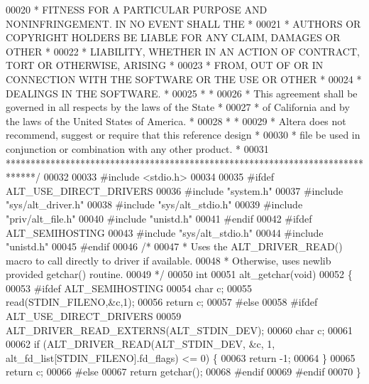 \begin{DoxyCode}
00020 \textcolor{comment}{* FITNESS FOR A PARTICULAR PURPOSE AND NONINFRINGEMENT. IN NO EVENT SHALL THE *}
00021 \textcolor{comment}{* AUTHORS OR COPYRIGHT HOLDERS BE LIABLE FOR ANY CLAIM, DAMAGES OR OTHER      *}
00022 \textcolor{comment}{* LIABILITY, WHETHER IN AN ACTION OF CONTRACT, TORT OR OTHERWISE, ARISING     *}
00023 \textcolor{comment}{* FROM, OUT OF OR IN CONNECTION WITH THE SOFTWARE OR THE USE OR OTHER         *}
00024 \textcolor{comment}{* DEALINGS IN THE SOFTWARE.                                                   *}
00025 \textcolor{comment}{*                                                                             *}
00026 \textcolor{comment}{* This agreement shall be governed in all respects by the laws of the State   *}
00027 \textcolor{comment}{* of California and by the laws of the United States of America.              *}
00028 \textcolor{comment}{*                                                                             *}
00029 \textcolor{comment}{* Altera does not recommend, suggest or require that this reference design    *}
00030 \textcolor{comment}{* file be used in conjunction or combination with any other product.          *}
00031 \textcolor{comment}{******************************************************************************/}
00032 
00033 \textcolor{preprocessor}{#include <stdio.h>}
00034 
00035 \textcolor{preprocessor}{#ifdef ALT\_USE\_DIRECT\_DRIVERS}
00036 \textcolor{preprocessor}{#include "system.h"}
00037 \textcolor{preprocessor}{#include "sys/alt_driver.h"}
00038 \textcolor{preprocessor}{#include "sys/alt_stdio.h"}
00039 \textcolor{preprocessor}{#include "priv/alt_file.h"}
00040 \textcolor{preprocessor}{#include "unistd.h"}
00041 \textcolor{preprocessor}{#endif}
00042 \textcolor{preprocessor}{#ifdef ALT\_SEMIHOSTING}
00043 \textcolor{preprocessor}{#include "sys/alt_stdio.h"}
00044 \textcolor{preprocessor}{#include "unistd.h"}
00045 \textcolor{preprocessor}{#endif}
00046 \textcolor{comment}{/*}
00047 \textcolor{comment}{ * Uses the ALT\_DRIVER\_READ() macro to call directly to driver if available.}
00048 \textcolor{comment}{ * Otherwise, uses newlib provided getchar() routine.}
00049 \textcolor{comment}{ */}
00050 \textcolor{keywordtype}{int} 
00051 alt_getchar(\textcolor{keywordtype}{void})
00052 \{
00053 \textcolor{preprocessor}{#ifdef ALT\_SEMIHOSTING}
00054     \textcolor{keywordtype}{char} c;
00055     read(STDIN\_FILENO,&c,1);
00056     \textcolor{keywordflow}{return} c;
00057 \textcolor{preprocessor}{#else}
00058 \textcolor{preprocessor}{#ifdef ALT\_USE\_DIRECT\_DRIVERS}
00059     ALT_DRIVER_READ_EXTERNS(ALT_STDIN_DEV);
00060     \textcolor{keywordtype}{char} c;
00061 
00062     \textcolor{keywordflow}{if} (ALT_DRIVER_READ(ALT_STDIN_DEV, &c, 1, alt_fd_list[STDIN\_FILENO].fd\_flags) <= 0) \{
00063         \textcolor{keywordflow}{return} -1;
00064     \}
00065     \textcolor{keywordflow}{return} c;
00066 \textcolor{preprocessor}{#else}
00067     \textcolor{keywordflow}{return} getchar();
00068 \textcolor{preprocessor}{#endif}
00069 \textcolor{preprocessor}{#endif}
00070 \}
\end{DoxyCode}
